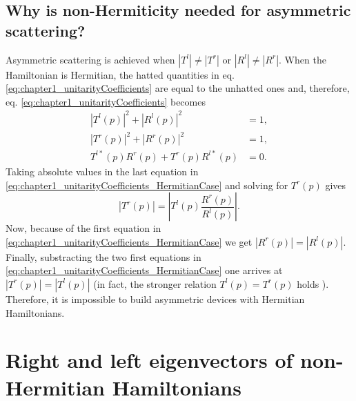 \subsection{Why is non-Hermiticity needed for asymmetric scattering?}

Asymmetric scattering is achieved when $\left|T^l\right|\neq\left|T^r\right|$ or $\left|R^l\right|\neq\left|R^r\right|$. When the Hamiltonian is Hermitian, the hatted quantities in eq. \eqref{eq:chapter1_unitarityCoefficients} are equal to the unhatted ones and, therefore, eq. \eqref{eq:chapter1_unitarityCoefficients} becomes
%
\begin{align}
  \left|T^l(p)\right|^2 +  \left|R^l(p)\right|^2  &= 1,\nonumber
  \\
  \left|T^r(p)\right|^2 +  \left|R^r(p)\right|^2  &= 1,\nonumber
  \\
   T^{l*}(p) R^r(p) + T^r(p)  R^{l*}(p) &= 0.
  \label{eq:chapter1_unitarityCoefficients_HermitianCase}
\end{align}
%
Taking absolute values in the last equation in \eqref{eq:chapter1_unitarityCoefficients_HermitianCase} and solving for $T^{r}(p)$ gives
%
\begin{equation}
  \left|T^r(p)\right|  = \left| T^{l}(p) \frac{R^r(p)}{R^{l}(p)} \right|.
\end{equation}
%
Now, because of the first equation in \eqref{eq:chapter1_unitarityCoefficients_HermitianCase} we get $\left|R^r(p)\right| = \left|R^l(p)\right|$. Finally, substracting the two first equations in \eqref{eq:chapter1_unitarityCoefficients_HermitianCase} one arrives at $\left|T^r(p)\right| = \left|T^l(p)\right|$ (in fact, the stronger relation $T^l(p) = T^r(p)$ holds \cite{Muga2004}). Therefore, it is impossible to build asymmetric devices with Hermitian Hamiltonians.

\section{Right and left eigenvectors of non-Hermitian Hamiltonians\label{sec:chapter1_LeftAndRightEigenstates}}

